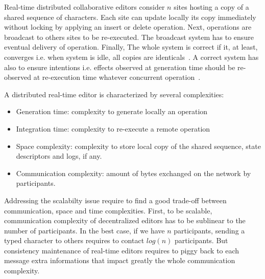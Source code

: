 Real-time distributed collaborative editors consider $n$ sites
hosting a copy of a shared sequence of characters. Each site can
update locally its copy immediately without locking by applying an
insert or delete operation. Next, operations are broadcast to others
sites to be re-executed. The broadcast system has to ensure eventual
delivery of operation. Finally, The whole system is correct if it, at
least, converges i.e. when system is idle, all copies are
identicals~\cite{bailis2013eventual}. A correct system has also to
ensure intentions i.e. effects observed at generation time should be
re-observed at re-execution time whatever concurrent
operation~\cite{sun1998achieving}.

A distributed real-time editor is characterized by several
complexities:
\begin{itemize}
\item Generation time: complexity to generate locally an operation
\item Integration time: complexity to re-execute a remote operation
\item Space complexity: complexity to store local copy of the shared
  sequence, state descriptors and logs, if any.
\item Communication complexity: amount of bytes exchanged on the
  network by participants. 
\end{itemize}

Addressing the scalabilty issue require to find a good trade-off
between communication, space and time complexities. First, to be
scalable, communication complexity of decentralized editors has to be
sublinear to the number of participants. In the best case, if we have
$n$ participants, sending a typed character to others requires to
contact $log(n)$ participants. But consistency maintenance of
real-time editors requires to piggy back to each message extra
informations that impact greatly the whole communication complexity.

